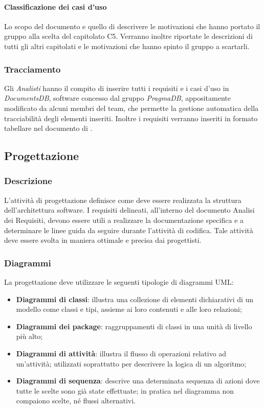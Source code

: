 \paragraph{Classificazione dei casi d'uso}
Lo scopo del documento e quello di descrivere le motivazioni che hanno portato il gruppo alla scelta del capitolato C5.
Verranno inoltre riportate le descrizioni di tutti gli altri capitolati e le motivazioni che hanno spinto il gruppo a scartarli.

\subsubsection{Tracciamento}
Gli \textsl{Analisti} hanno il compito di inserire tutti i requisiti e i casi d'uso in \textsl{DocumentsDB},
software concesso dal gruppo \textsl{PragmaDB}, appositamente modificato da alcuni membri del 
team, che permette la gestione automatica della tracciabilità degli elementi inseriti. 
Inoltre i requisiti verranno inseriti in formato tabellare nel documento di \textsl{\AdR}.
\subsection{Progettazione}


\subsubsection{Descrizione}
L'attività di progettazione definisce come deve essere realizzata la struttura dell'architettura software. I requisiti delineati, all'interno del documento Analisi dei Requisiti, devono essere utili a realizzare la documentazione specifica e a determinare le linee guida da seguire durante l'attività di codifica. 
Tale attività deve essere svolta in maniera ottimale e precisa dai progettisti.  
  
\subsubsection{Diagrammi}
La progettazione deve utilizzare le seguenti tipologie di diagrammi UML:
\begin{itemize} 
\item
\textbf{Diagrammi di classi}: illustra una collezione di elementi dichiarativi di un modello come classi e tipi, assieme ai loro contenuti e alle loro relazioni;  
\item
\textbf{Diagrammi dei package}: raggruppamenti di classi in una unità di livello più alto;
\item
\textbf{Diagrammi di attività}: illustra il flusso di operazioni relativo ad un'attività; utilizzati soprattutto per descrivere la logica di un algoritmo;  
\item
\textbf{Diagrammi di sequenza}: descrive una determinata sequenza di azioni dove tutte le scelte sono già state effettuate; in pratica nel diagramma non compaiono scelte, né flussi alternativi.
\end{itemize}


